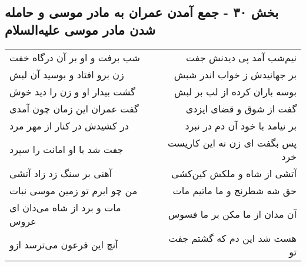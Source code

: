 \begin{center}
\section*{بخش ۳۰ - جمع آمدن عمران به مادر موسی و حامله شدن مادر موسی علیه‌السلام}
\label{sec:sh030}
\begin{longtable}{l p{0.5cm} r}
شب برفت و او بر آن درگاه خفت
&&
نیم‌شب آمد پی دیدنش جفت
\\
زن برو افتاد و بوسید آن لبش
&&
بر جهانیدش ز خواب اندر شبش
\\
گشت بیدار او و زن را دید خوش
&&
بوسه باران کرده از لب بر لبش
\\
گفت عمران این زمان چون آمدی
&&
گفت از شوق و قضای ایزدی
\\
در کشیدش در کنار از مهر مرد
&&
بر نیامد با خود آن دم در نبرد
\\
جفت شد با او امانت را سپرد
&&
پس بگفت ای زن نه این کاریست خرد
\\
آهنی بر سنگ زد زاد آتشی
&&
آتشی از شاه و ملکش کین‌کشی
\\
من چو ابرم تو زمین موسی نبات
&&
حق شه شطرنج و ما ماتیم مات
\\
مات و برد از شاه می‌دان ای عروس
&&
آن مدان از ما مکن بر ما فسوس
\\
آنچ این فرعون می‌ترسد ازو
&&
هست شد این دم که گشتم جفت تو
\\
\end{longtable}
\end{center}
